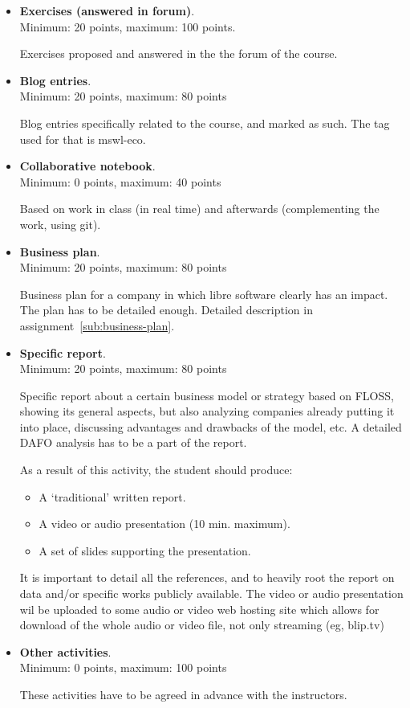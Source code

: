 \documentclass[a4paper]{article}
\begin{document}
\begin{itemize}
\item \textbf{Exercises (answered in forum)}. \\
  Minimum: 20 points, maximum: 100 points.

  Exercises proposed and answered in the the forum of the course.

\item \textbf{Blog entries}. \\
  Minimum: 20 points, maximum: 80 points

  Blog entries specifically related to the course, and marked as such. The tag used for that is mswl-eco.

\item \textbf{Collaborative notebook}. \\
  Minimum: 0 points, maximum: 40 points

  Based on work in class (in real time) and afterwards (complementing the work, using git).

\item \textbf{Business plan}. \\
  Minimum: 20 points, maximum: 80 points

  Business plan for a company in which libre software clearly has an impact. The plan has to be detailed enough. Detailed description in assignment~\ref{sub:business-plan}.

\item \textbf{Specific report}. \\
  Minimum: 20 points, maximum: 80 points

Specific report about a certain business model or strategy based on FLOSS, showing its general aspects, but also analyzing companies already putting it into place, discussing advantages and drawbacks of the model, etc. A detailed DAFO analysis has to be a part of the report.

As a result of this activity, the student should produce:

\begin{itemize}
\item A `traditional' written report.
\item A video or audio presentation (10 min. maximum).
\item A set of slides supporting the presentation.
\end{itemize}

 It is important to detail all the references, and to heavily root the report on data and/or specific works publicly available. The video or audio presentation  wil be uploaded to some audio or video web hosting site which allows for download of the whole audio or video file, not only streaming (eg, blip.tv)

\item \textbf{Other activities}. \\
  Minimum: 0 points, maximum: 100 points

  These activities have to be agreed in advance with the instructors.
\end{itemize}
\end{document}
